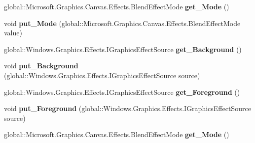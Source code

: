 \begin{DoxyCompactItemize}
global\+::\+Microsoft.\+Graphics.\+Canvas.\+Effects.\+Blend\+Effect\+Mode {\bfseries get\+\_\+\+Mode} ()
\item 
\mbox{\label{interface_microsoft_1_1_graphics_1_1_canvas_1_1_effects_1_1_i_blend_effect_a74ac8a0ad43cf91117230932b4bf02f3}} 
void {\bfseries put\+\_\+\+Mode} (global\+::\+Microsoft.\+Graphics.\+Canvas.\+Effects.\+Blend\+Effect\+Mode value)
\item 
\mbox{\label{interface_microsoft_1_1_graphics_1_1_canvas_1_1_effects_1_1_i_blend_effect_a9bf514b43e36b2488c8d53157b276ac0}} 
global\+::\+Windows.\+Graphics.\+Effects.\+I\+Graphics\+Effect\+Source {\bfseries get\+\_\+\+Background} ()
\item 
\mbox{\label{interface_microsoft_1_1_graphics_1_1_canvas_1_1_effects_1_1_i_blend_effect_a16dda1810dcd399600c55e24b03baa2c}} 
void {\bfseries put\+\_\+\+Background} (global\+::\+Windows.\+Graphics.\+Effects.\+I\+Graphics\+Effect\+Source source)
\item 
\mbox{\label{interface_microsoft_1_1_graphics_1_1_canvas_1_1_effects_1_1_i_blend_effect_a27971086ad5738eee6bc56e8fa2047a8}} 
global\+::\+Windows.\+Graphics.\+Effects.\+I\+Graphics\+Effect\+Source {\bfseries get\+\_\+\+Foreground} ()
\item 
\mbox{\label{interface_microsoft_1_1_graphics_1_1_canvas_1_1_effects_1_1_i_blend_effect_a9bc8bd434ced7607b3252e64f0a1cf9f}} 
void {\bfseries put\+\_\+\+Foreground} (global\+::\+Windows.\+Graphics.\+Effects.\+I\+Graphics\+Effect\+Source source)
\item 
\mbox{\label{interface_microsoft_1_1_graphics_1_1_canvas_1_1_effects_1_1_i_blend_effect_ac8d75c7f80a966ae4cb4accb65b3f2ba}} 
global\+::\+Microsoft.\+Graphics.\+Canvas.\+Effects.\+Blend\+Effect\+Mode {\bfseries get\+\_\+\+Mode} ()
\item 
\mbox{\label{interface_microsoft_1_1_graphics_1_1_canvas_1_1_effects_1_1_i_blend_effect_a74ac8a0ad43cf91117230932b4bf02f3}} 

\end{DoxyCompactItemize}
